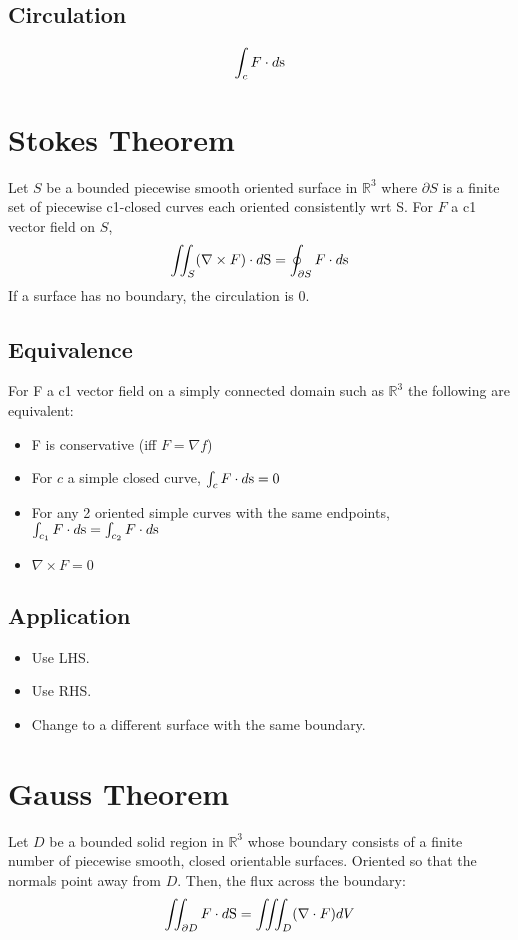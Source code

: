 \subsection*{Circulation}
$$\int_{c}F\cdot d\s$$
\section*{Stokes Theorem}
Let $S$ be a bounded piecewise smooth oriented surface in $\mathbb{R}^3$ where $\partial S$ is a finite set of piecewise c1-closed curves each oriented consistently wrt S. For $F$ a c1 vector field on $S$,
$$\iint_{S}(\nabla \times F)\cdot d\S = \oint_{\partial S} F\cdot d\s$$
If a surface has no boundary, the circulation is 0.
\subsection*{Equivalence}
For F a c1 vector field on a simply connected domain such as $\mathbb{R}^3$ the following are equivalent:
\begin{itemize}
    \item F is conservative (iff $F=\nabla f$)
    \item For $c$ a simple closed curve, $\int_{c}F\cdot d\s = 0$
    \item For any 2 oriented simple curves with the same endpoints, $\int_{c_1} F\cdot d\s= \int_{c_2}F\cdot d\s$
    \item $\nabla \times F = 0$
\end{itemize}{}

\subsection*{Application}
\begin{itemize}
    \item Use LHS.
    \item Use RHS.
    \item Change to a different surface with the same boundary.
\end{itemize}{}

\section*{Gauss Theorem}
Let $D$ be a bounded solid region in $\mathbb{R}^3$ whose boundary consists of a finite number of piecewise smooth, closed orientable surfaces. Oriented so that the normals point away from $D$. Then, the flux across the boundary:
$$\iint_{\partial D}F\cdot d\S = \iiint_{D}(\nabla\cdot F) dV$$
